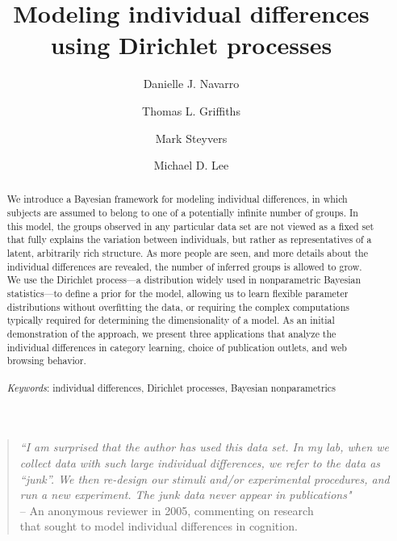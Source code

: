 \documentclass[authoryear]{elsarticle}
\begin{document}
\begin{frontmatter}

\title{Modeling individual differences using Dirichlet processes}

\journal{}

\author[adel]{Danielle J. Navarro}

\author[brown]{Thomas L. Griffiths}
\author[uci]{Mark Steyvers}
\author[adel]{Michael D. Lee}


\address[adel]{School of Psychology, University of Adelaide, Australia}
\address[brown]{Department of Cognitive and Linguistic Sciences, Brown University}
\address[uci]{Department of Cognitive Sciences, University of California, Irvine}



	\begin{abstract}
  We introduce a Bayesian framework for modeling individual differences,
  in which subjects are assumed to belong to one of a potentially infinite
  number of groups. In this model, the groups observed in any particular
  data set are not viewed as a fixed set that fully explains the variation
  between individuals, but rather as representatives of a latent, arbitrarily rich
  structure. As more people are seen, and more details about the individual
  differences are revealed, the number of inferred groups
  is allowed to grow. We use the Dirichlet process---a distribution widely
  used in nonparametric Bayesian statistics---to define a prior for the
  model, allowing us to learn flexible parameter distributions without
  overfitting the data, or requiring the complex computations
  typically required for determining the dimensionality of a model. As an initial
  demonstration of the approach, we present three
  applications that analyze the individual differences
  in category learning, choice of publication
  outlets, and web browsing behavior.\\ \\
	{\it Keywords}: individual differences, Dirichlet processes, Bayesian nonparametrics
	\end{abstract}

\end{frontmatter}


\begin{verse}
\vspace*{1cm}
\noindent
{\it ``I am surprised that the author has used this data set.  In my lab,
when we collect data with such large individual differences, we refer to the
data as ``junk''. We then re-design our stimuli and/or experimental
procedures, and run a new experiment.  The junk data never appear in
publications"}\\
\hspace*{60pt} -- An anonymous reviewer in 2005, commenting on research \\
\hspace*{70pt} that sought to model individual differences in cognition.
\end{verse}
\end{document}
